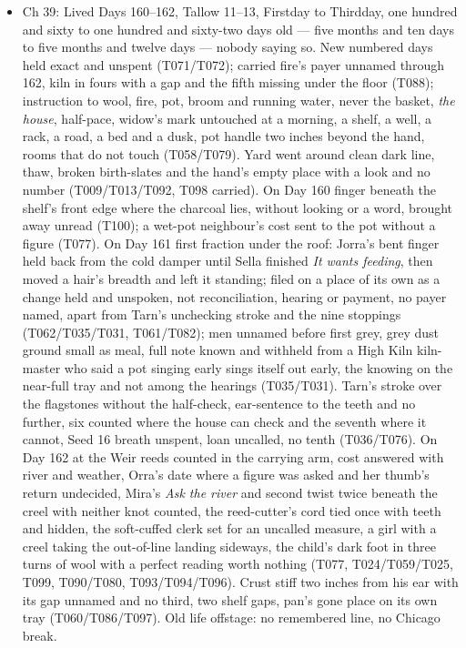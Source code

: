 \documentclass{design/chronicle}
\begin{document}
{\begin{itemize}[leftmargin=1.4em,itemsep=1pt,topsep=3pt,parsep=0pt]
\end{itemize}

\begin{itemize}[leftmargin=1.4em,itemsep=1pt,topsep=3pt,parsep=0pt]

\item Ch 39: Lived Days 160–162, Tallow 11–13, Firstday to Thirdday, one hundred and sixty to one hundred and sixty-two days old — five months and ten days to five months and twelve days — nobody saying so. New numbered days held exact and unspent (T071/T072); carried fire’s payer unnamed through 162, kiln in fours with a gap and the fifth missing under the floor (T088); instruction to wool, fire, pot, broom and running water, never the basket, \emph{the house}, half-pace, widow’s mark untouched at a morning, a shelf, a well, a rack, a road, a bed and a dusk, pot handle two inches beyond the hand, rooms that do not touch (T058/T079). Yard went around clean dark line, thaw, broken birth-slates and the hand’s empty place with a look and no number (T009/T013/T092, T098 carried). On Day 160 finger beneath the shelf’s front edge where the charcoal lies, without looking or a word, brought away unread (T100); a wet-pot neighbour’s cost sent to the pot without a figure (T077). On Day 161 first fraction under the roof: Jorra’s bent finger held back from the cold damper until Sella finished \emph{It wants feeding}, then moved a hair’s breadth and left it standing; filed on a place of its own as a change held and unspoken, not reconciliation, hearing or payment, no payer named, apart from Tarn’s unchecking stroke and the nine stoppings (T062/T035/T031, T061/T082); men unnamed before first grey, grey dust ground small as meal, full note known and withheld from a High Kiln kiln-master who said a pot singing early sings itself out early, the knowing on the near-full tray and not among the hearings (T035/T031). Tarn’s stroke over the flagstones without the half-check, ear-sentence to the teeth and no further, six counted where the house can check and the seventh where it cannot, Seed 16 breath unspent, loan uncalled, no tenth (T036/T076). On Day 162 at the Weir reeds counted in the carrying arm, cost answered with river and weather, Orra’s date where a figure was asked and her thumb’s return undecided, Mira’s \emph{Ask the river} and second twist twice beneath the creel with neither knot counted, the reed-cutter’s cord tied once with teeth and hidden, the soft-cuffed clerk set for an uncalled measure, a girl with a creel taking the out-of-line landing sideways, the child’s dark foot in three turns of wool with a perfect reading worth nothing (T077, T024/T059/T025, T099, T090/T080, T093/T094/T096). Crust stiff two inches from his ear with its gap unnamed and no third, two shelf gaps, pan’s gone place on its own tray (T060/T086/T097). Old life offstage: no remembered line, no Chicago break.


\end{itemize}}
\end{document}
